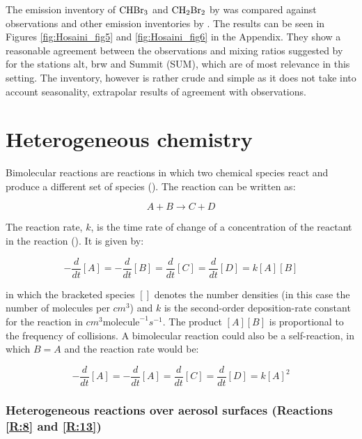 The emission inventory of $\mathrm{CHBr_3}$ and $\mathrm{CH_2Br_2}$ by \cite{Liang2010} was compared against observations and other emission inventories by \cite{Hossaini2013}. The results can be seen in Figures \ref{fig:Hosaini_fig5} and \ref{fig:Hosaini_fig6} in the Appendix. They show a reasonable agreement between the observations and mixing ratios suggested by \cite{Liang2010} for the stations \acrfull{alt}, \acrfull{brw} and Summit (SUM), which are of most relevance in this setting. The inventory, however is rather crude and simple as it does not take into account seasonality, extrapolar results of agreement with observations. 






\section{Heterogeneous chemistry}\label{sec:het_chem}

Bimolecular reactions are reactions in which two chemical species react and produce a different set of species (\cite{Jacob1999}). The reaction can be written as: 

\begin{equation*}
    A + B \rightarrow C + D
\end{equation*}

The reaction rate, $k$, is the time rate of change of a concentration of the reactant in the reaction (\cite{AtmModFund}). It is given by: 

\begin{equation*}
    -\frac{d}{dt}[A] = -\frac{d}{dt}[B] = \frac{d}{dt}[C] = \frac{d}{dt}[D] = k[A][B]
\end{equation*}

in which the bracketed species $[]$ denotes the number densities (in this case the number of molecules per $cm^3$) and $k$ is the second-order deposition-rate constant for the reaction in $cm^3\text{molecule}^{-1}s^{-1}$. The product $[A][B]$ is proportional to the frequency of collisions. A bimolecular reaction could also be a self-reaction, in which $B = A$ and the reaction rate would be:

\begin{equation*}
    -\frac{d}{dt}[A] = -\frac{d}{dt}[A] = \frac{d}{dt}[C] = \frac{d}{dt}[D] = k[A]^2
\end{equation*}

\subsubsection{Heterogeneous reactions over aerosol surfaces (Reactions \ref{R:8} and \ref{R:13})}\label{sec:aerosol_react}

